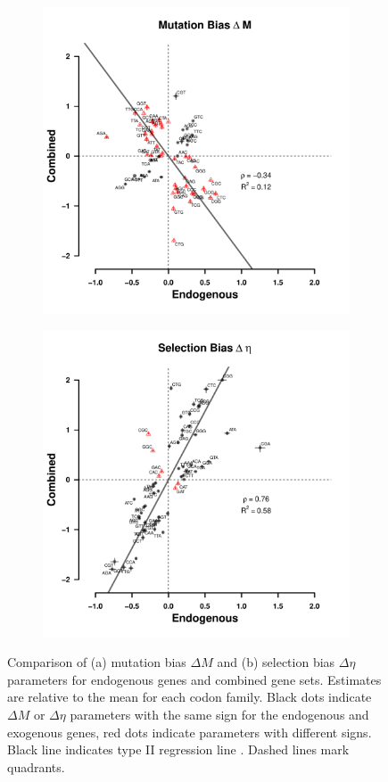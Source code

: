 \documentclass[doublespacing,linenumbers]{bmcart-modified}
\newcommand{\DM}{\ensuremath{{\Delta M}}\xspace}
\newcommand{\DE}{\ensuremath{{\Delta \eta}}\xspace}
\begin{document}
\begin{backmatter}
\begin{figure}
    \centering
    \begin{subfigure}
        \centering
        \includegraphics[width=.45\textwidth]{img/figS6a.pdf}%
    \end{subfigure}
    \begin{subfigure}
        \centering
        \includegraphics[width=.45\textwidth]{img/figS6b.pdf}%
    \end{subfigure}
    \caption{Comparison of (a) mutation bias \DM and (b) selection bias \DE parameters for endogenous genes and combined gene sets.
      Estimates are relative to the mean for each codon family.
      Black dots indicate \DM or \DE parameters with the same sign for the endogenous and exogenous genes, red dots indicate parameters with different signs.
      Black line indicates type II regression line \citep{SokalAndRohlf1981}.
      Dashed lines mark quadrants.}
    \label{fig:csp_end_comb}
\end{figure}
\null
\vfill


\end{backmatter}
\end{document}
